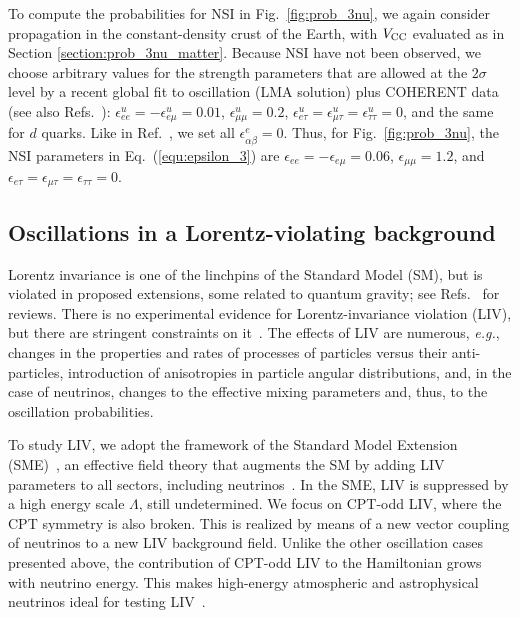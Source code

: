 \documentclass[final,5p,times,twocolumn]{elsarticle}
\newcommand{\eg}{{\it e.g.}}
\newcommand{\eq}{Eq.}
\newcommand{\fig}{Fig.}
\newcommand{\Ref}{Ref.}
\newcommand{\Refs}{Refs.}
\newcommand{\equ}[1]{\eq~(\ref{equ:#1})}
\newcommand{\figu}[1]{\fig~\ref{fig:#1}}
\begin{document}
To compute the probabilities for NSI in \figu{prob_3nu}, we again consider propagation in the constant-density crust of the Earth, with $V_{\rm CC}$ evaluated as in Section \ref{section:prob_3nu_matter}.  Because NSI have not been observed, we choose arbitrary values for the strength parameters that are allowed at the $2\sigma$ level by a recent global fit to oscillation (LMA solution) plus COHERENT data\ \cite{Esteban:2018ppq} (see also \Refs\ \cite{Mitsuka:2011ty, Esmaili:2013fva, Salvado:2016uqu, Aartsen:2017xtt}): $\epsilon_{ee}^u = -\epsilon_{e\mu}^u = 0.01$, $\epsilon_{\mu\mu}^u = 0.2$, $\epsilon_{e\tau}^u = \epsilon_{\mu\tau}^u = \epsilon_{\tau\tau}^u = 0$, and the same for $d$ quarks.  Like in \Ref\ \cite{Esteban:2018ppq}, we set all $\epsilon_{\alpha\beta}^e = 0$.  Thus, for \figu{prob_3nu}, the NSI parameters in \equ{epsilon_3} are $\epsilon_{ee} = -\epsilon_{e\mu} = 0.06$, $\epsilon_{\mu\mu} = 1.2$, and $\epsilon_{e\tau} = \epsilon_{\mu\tau} = \epsilon_{\tau\tau} = 0$.


\subsection{Oscillations in a Lorentz-violating background}

Lorentz invariance is one of the linchpins of the Standard Model (SM), but is violated in proposed extensions, some related to quantum gravity; see \Refs\ \cite{Mavromatos:2004sz, Liberati:2009pf, Liberati:2013xla, Tasson:2014dfa} for reviews.  There is no experimental evidence for Lorentz-invariance violation (LIV), but there are stringent constraints on it\ \cite{Kostelecky:2008ts, Abbasi:2010kx, Abe:2014wla, Aartsen:2017ibm}.  The effects of LIV are numerous, \eg, changes in the properties and rates of processes of particles versus their anti-particles, introduction of anisotropies in particle angular distributions, and, in the case of neutrinos, changes to the effective mixing parameters and, thus, to the oscillation probabilities.

To study LIV, we adopt the framework of the Standard Model Extension (SME)\ \cite{Colladay:1998fq}, an effective field theory that augments the SM by adding LIV parameters to all sectors, including neutrinos\ \cite{Coleman:1998ti, Kostelecky:2003xn, Kostelecky:2003cr,  GonzalezGarcia:2004wg, Hooper:2005jp, Kostelecky:2011gq, Diaz:2014yva}.  In the SME, LIV is suppressed by a high energy scale $\Lambda$, still undetermined.  We focus on CPT-odd LIV, where the CPT symmetry is also broken.  This is realized by means of a new vector coupling of neutrinos to a new LIV background field.  Unlike the other oscillation cases presented above, the contribution of CPT-odd LIV to the Hamiltonian grows with neutrino energy.  This makes high-energy atmospheric and astrophysical neutrinos ideal for testing LIV\ \cite{Coleman:1998ti, GonzalezGarcia:2004wg, GonzalezGarcia:2005xw, Anchordoqui:2005gj, Arguelles:2015dca, Bustamante:2015waa, Rasmussen:2017ert, Aartsen:2017ibm, Ahlers:2018mkf, Ackermann:2019cxh}.
\end{document}
